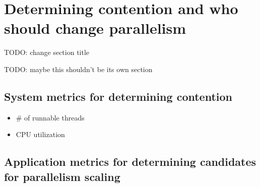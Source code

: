 \section{Determining contention and who should change parallelism}
TODO: change section title

TODO: maybe this shouldn't be its own section

\subsection{System metrics for determining contention}
\begin{itemize}
  \item \# of runnable threads
  \item CPU utilization
\end{itemize}

\subsection{Application metrics for determining candidates for parallelism scaling}
